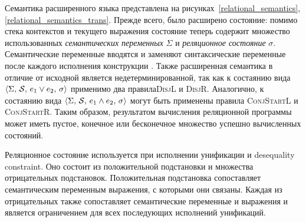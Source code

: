 Семантика расширенного языка представлена на рисунках~\ref{relational_semantics}, \ref{relational_semantics_trans}. Прежде всего, было расширено состояние: помимо стека контекстов и текущего выражения состояние теперь содержит множество использованных {\it семантических переменных} $\Sigma$ и {\it реляционное состояние} $\sigma$. Семантические переменные вводятся и заменяют синтаксические переменные после каждого исполнения конструкции . Также расширенная семантика в отличие от исходной является недетерминированной, так как к состаянию вида $\left<{\Sigma,\,\mathcal S,\,e_1\vee e_2,\,\sigma}\right>$ применимо два правила\textsc{DisjL} и \textsc{DisjR}. Аналогично, к состаянию вида $\left<{\Sigma,\,\mathcal S,\,e_1\wedge e_2,\,\sigma}\right>$ могут быть применены правила \textsc{ConjStartL} и \textsc{ConjStartR}. Таким образом, результатом вычисления реляционной программы может иметь пустое, конечное или бесконечное множество  успешно вычисленных состояний.

Реляционное состояние используется при исполнении унификации и desequality constraint. Оно состоит из положительной подстановки и множества отрицательных подстановок. Положительная подстановка сопоставляет семантическим переменным выражения, с которыми они связаны. Каждая из отрицательных также сопоставляет семантические переменные и выражения и является ограничением для всех последующих исполнений унификаций.

